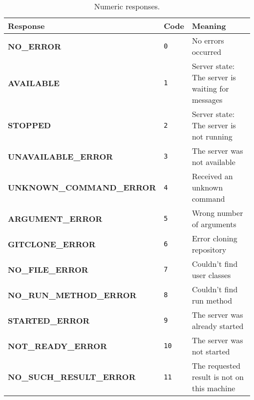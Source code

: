 \newcommand{\specialcell}[2][c]{%
  \begin{tabular}[#1]{@{}K@{}}#2\end{tabular}}


\begin{table}[htpb]
    \centering
    \tiny
    \begin{tabular}{@{}KTL@{}}
        \toprule
        {\bf Response} & {\bf Code} & {\bf Meaning} \\ \midrule
        {\tiny \bf NO\_ERROR} & 
        {\tiny \tt 0} & 
        {\tiny No errors occurred} \\ \midrule
        {\tiny \bf AVAILABLE} & 
        {\tiny \tt 1} & 
        {\tiny Server state: The server is waiting for messages} \\ \midrule
        {\tiny \bf STOPPED} & 
        {\tiny \tt 2} & 
        {\tiny Server state: The server is not running} \\ \midrule
        {\tiny \bf UNAVAILABLE\_ERROR} & 
        {\tiny \tt 3} & 
        {\tiny The server was not available} \\ \midrule
        {\tiny \bf UNKNOWN\_COMMAND\_ERROR} & 
        {\tiny \tt 4} & 
        {\tiny Received an unknown command} \\ \midrule
        {\tiny \bf ARGUMENT\_ERROR} & 
        {\tiny \tt 5} & 
        {\tiny Wrong number of arguments} \\ \midrule
        {\tiny \bf GITCLONE\_ERROR} & 
        {\tiny \tt 6} & 
        {\tiny Error cloning repository} \\ \midrule
        {\tiny \bf NO\_FILE\_ERROR} & 
        {\tiny \tt 7} & 
        {\tiny Couldn't find user classes} \\ \midrule
        {\tiny \bf NO\_RUN\_METHOD\_ERROR} & 
        {\tiny \tt 8} & 
        {\tiny Couldn't find run method} \\ \midrule
        {\tiny \bf STARTED\_ERROR} & 
        {\tiny \tt 9} & 
        {\tiny The server was already started} \\ \midrule
        {\tiny \bf NOT\_READY\_ERROR} & 
        {\tiny \tt 10} & 
        {\tiny The server was not started} \\ \midrule
        {\tiny \bf NO\_SUCH\_RESULT\_ERROR} & 
        {\tiny \tt 11} & 
        {\tiny The requested result is not on this machine} \\ \bottomrule
    \end{tabular}
    \caption{Numeric responses.}
    \label{tab:protocol-errors}
\end{table}
